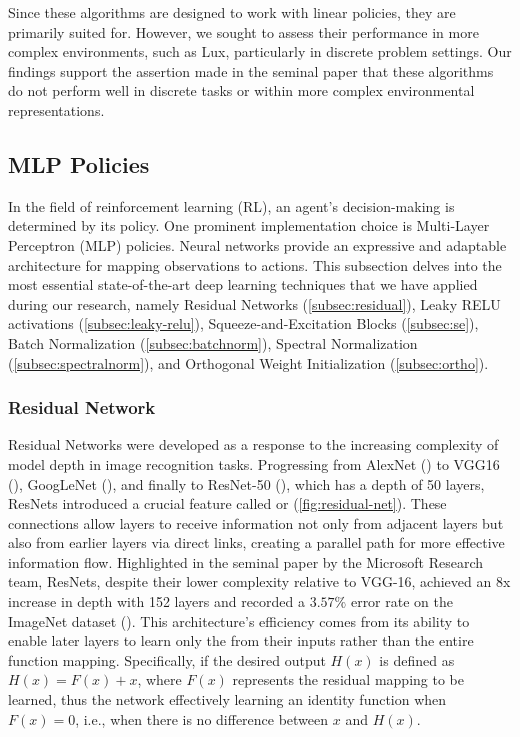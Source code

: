             \noindent Since these algorithms are designed to work with linear policies, they are primarily suited for. However, we sought to assess their performance in more complex environments, such as Lux, particularly in discrete problem settings. Our findings support the assertion made in the seminal paper that these algorithms do not perform well in discrete tasks or within more complex environmental representations. 


\subsection{MLP Policies}
\label{sec:mlp-policies}

    \noindent In the field of reinforcement learning (RL), an agent's decision-making is determined by its policy. One prominent implementation choice is Multi-Layer Perceptron (MLP) policies. Neural networks provide an expressive and adaptable architecture for mapping observations to actions. This subsection delves into the most essential state-of-the-art deep learning techniques that we have applied during our research, namely Residual Networks (\autoref{subsec:residual}), Leaky RELU activations (\autoref{subsec:leaky-relu}), Squeeze-and-Excitation Blocks (\autoref{subsec:se}), Batch Normalization (\autoref{subsec:batchnorm}), Spectral Normalization (\autoref{subsec:spectralnorm}), and Orthogonal Weight Initialization (\autoref{subsec:ortho}).

    \subsubsection{Residual Network}\label{subsec:residual}

        \noindent Residual Networks were developed as a response to the increasing complexity of model depth in image recognition tasks. Progressing from AlexNet (\textcolor{deepblue}{\cite{AlexNet}}) to VGG16 (\textcolor{deepblue}{\cite{simonyan2015deep}}), GoogLeNet (\textcolor{deepblue}{\cite{szegedy2014going}}), and finally to ResNet-50 (\textcolor{deepblue}{\cite{he2015deep}}), which has a depth of 50 layers, ResNets introduced a crucial feature called or (\textcolor{deepblue}{\autoref{fig:residual-net}}). These connections allow layers to receive information not only from adjacent layers but also from earlier layers via direct links, creating a parallel path for more effective information flow. Highlighted in the seminal paper by the Microsoft Research team, ResNets, despite their lower complexity relative to VGG-16, achieved an 8x increase in depth with 152 layers and recorded a $3.57\%$ error rate on the ImageNet dataset (\textcolor{deepblue}{\cite{he2015deep}}). This architecture's efficiency comes from its ability to enable later layers to learn only the from their inputs rather than the entire function mapping. Specifically, if the desired output $H(x)$ is defined as $H(x)=F(x) + x$, where $F(x)$ represents the residual mapping to be learned, thus the network effectively learning an identity function when $F(x)=0$, i.e., when there is no difference between $x$ and $H(x)$.
        
